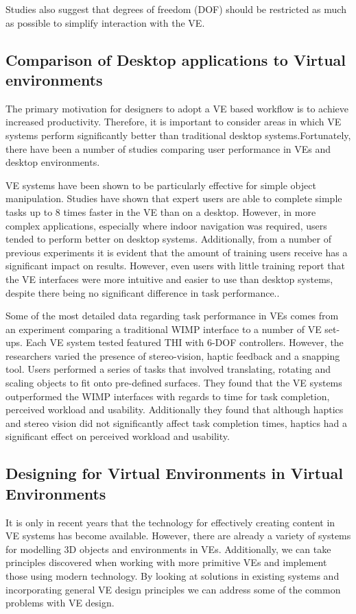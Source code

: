 \documentclass{sig-alternate-05-2015}
\begin{document}
 
 Studies also suggest that degrees of freedom (DOF) should be restricted as much as possible to simplify interaction with the VE.\cite{Bowman2001}

\subsection{Comparison of Desktop applications to Virtual environments}
The primary motivation for designers to adopt a VE based workflow is to achieve increased productivity. Therefore, it is important to consider areas in which VE systems perform significantly better than traditional desktop systems.Fortunately, there have been a number of studies comparing user performance in VEs and desktop environments.

VE systems have been shown to be particularly effective for simple object manipulation. Studies have shown that expert users are able to complete simple tasks up to 8 times faster in the VE than on a desktop\cite{Schultheis2012}. However, in more complex applications, especially where indoor navigation was required, users tended to perform better on desktop systems\cite{SousaSantos2009}. Additionally, from a number of previous experiments it is evident that the amount of training users receive has a significant impact on results. However, even users with little training report that the VE interfaces were more intuitive and easier to use than desktop systems, despite there being no significant difference in task performance.\cite{Toma2012}.

Some of the most detailed data regarding task performance in VEs comes from an experiment comparing a traditional WIMP interface to a number of VE set-ups. Each VE system tested featured THI with 6-DOF controllers. However, the researchers varied the presence of stereo-vision, haptic feedback and a snapping tool\cite{Scali2003}. Users performed a series of tasks that involved translating, rotating and scaling objects to fit onto pre-defined surfaces. They found that the VE systems outperformed the WIMP interfaces with regards to time for task completion, perceived workload and usability. Additionally they found that although haptics and stereo vision did not significantly affect task completion times, haptics had a significant effect on perceived workload and usability.
\subsection{Designing for Virtual Environments in Virtual Environments}
It is only in recent years that the technology for effectively creating content in VE systems has become available. However, there are already a variety of systems for modelling 3D objects and environments in VEs. Additionally, we can take principles discovered when working with more primitive VEs and implement those using modern technology. By looking at solutions in existing systems and incorporating general VE design principles we can address some of the common problems with VE design.
\end{document}
